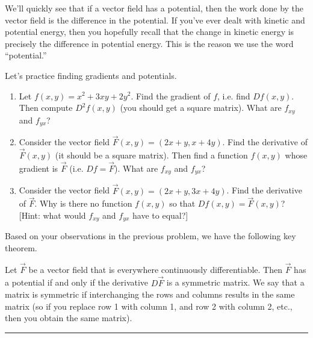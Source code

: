 We'll quickly see that if a vector field has a potential, then the work done by the vector field is the difference in the potential.  If you've ever dealt with kinetic and potential energy, then you hopefully recall that the change in kinetic energy is precisely the difference in potential energy.  This is the reason we use the word ``potential.''

\begin{problem}
%
Let's practice finding gradients and potentials.
\begin{enumerate}
 \item  Let $f(x,y) = x^2+3xy+2y^2$. Find the gradient of $f$, i.e. find $Df(x,y)$. Then compute $D^2f(x,y)$ (you should get a square matrix). What are $f_{xy}$ and $f_{yx}$?
 \item Consider the vector field $\vec F(x,y)=(2x+y,x+4y)$. Find the derivative of $\vec F(x,y)$ (it should be a square matrix). Then find a function $f(x,y)$ whose gradient is $\vec F$ (i.e. $Df=\vec F$). What are $f_{xy}$ and $f_{yx}$?
 \item {}%
Consider the vector field $\vec F(x,y)=(2x+y,3x+4y)$.  Find the derivative of $\vec F$.  Why is there no function $f(x,y)$ so that $Df(x,y)=\vec F(x,y)$? [Hint: what would $f_{xy}$ and $f_{yx}$ have to equal?] 
\end{enumerate}
\end{problem}

Based on your observations in the previous problem, we have the following key theorem.

\begin{theorem}
 Let $\vec F$ be a vector field that is everywhere continuously differentiable. Then $\vec F$ has a potential if and only if the derivative $D\vec F$ is a symmetric matrix. We say that a matrix is symmetric if interchanging the rows and columns results in the same matrix (so if you replace row 1 with column 1, and row 2 with column 2, etc., then you obtain the same matrix).  
\end{theorem}

\hrule

